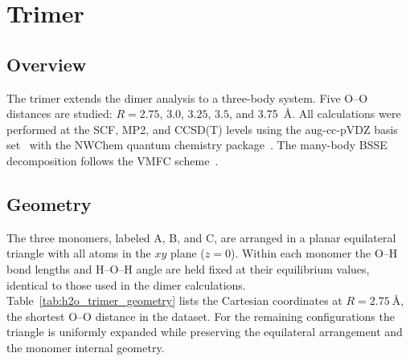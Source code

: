 
\section{ Trimer}

\subsection{Overview}

The  trimer extends the dimer analysis to a three-body system.
Five O--O distances are studied: $R = 2.75$, $3.0$, $3.25$, $3.5$,
and \SI{3.75}{\angstrom}. All calculations were performed at the SCF,
MP2, and CCSD(T) levels using the aug-cc-pVDZ basis
set~\cite{dunning1989,kendall1992} with the NWChem quantum chemistry
package~\cite{nwchem2020}. The many-body BSSE decomposition follows
the VMFC scheme~\cite{valiron1997}.

\subsection{Geometry}

The three  monomers, labeled A, B, and C, are arranged in a
planar equilateral triangle with all atoms in the $xy$ plane ($z = 0$).
Within each monomer the O--H bond lengths and H--O--H angle are held
fixed at their equilibrium values, identical to those used in the dimer
calculations. Table~\ref{tab:h2o_trimer_geometry} lists the Cartesian
coordinates at $R = \SI{2.75}{\angstrom}$, the shortest O--O distance
in the dataset. For the remaining configurations the triangle is
uniformly expanded while preserving the equilateral arrangement and
the monomer internal geometry.

